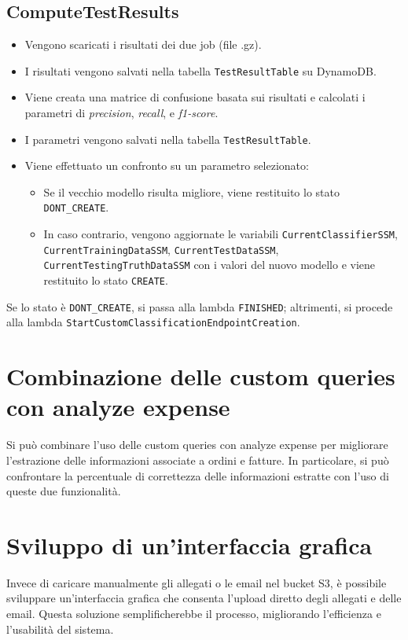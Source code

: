 \subsection{ComputeTestResults}
\begin{itemize}
  \item Vengono scaricati i risultati dei due job (file .gz).
  \item I risultati vengono salvati nella tabella \texttt{TestResultTable} su DynamoDB.
  \item Viene creata una matrice di confusione basata sui risultati e calcolati i parametri di \textit{precision}, \textit{recall}, e \textit{f1-score}.
  \item I parametri vengono salvati nella tabella \texttt{TestResultTable}.
  \item Viene effettuato un confronto su un parametro selezionato:
  \begin{itemize}
    \item Se il vecchio modello risulta migliore, viene restituito lo stato \texttt{DONT\_CREATE}.
    \item In caso contrario, vengono aggiornate le variabili \texttt{CurrentClassifierSSM}, \texttt{CurrentTrainingDataSSM}, \texttt{CurrentTestDataSSM}, \texttt{CurrentTestingTruthDataSSM} con i valori del nuovo modello e viene restituito lo stato \texttt{CREATE}.
  \end{itemize} 
\end{itemize}
Se lo stato è \texttt{DONT\_CREATE}, si passa alla lambda \texttt{FINISHED}; altrimenti, si procede alla lambda \texttt{StartCustomClassificationEndpointCreation}.

\section{Combinazione delle custom queries con analyze expense}
Si può combinare l'uso delle custom queries con analyze expense per migliorare l'estrazione delle informazioni associate a ordini e fatture. In particolare, si può confrontare la percentuale di correttezza delle informazioni estratte con l'uso di queste due funzionalità.

\section{Sviluppo di un'interfaccia grafica}
Invece di caricare manualmente gli allegati o le email nel bucket S3, è possibile sviluppare un'interfaccia grafica che consenta l'upload diretto degli allegati e delle email. Questa soluzione semplificherebbe il processo, migliorando l'efficienza e l'usabilità del sistema.

